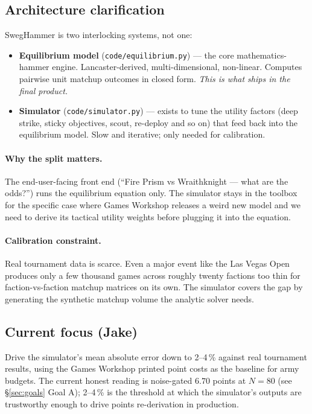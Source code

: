\documentclass[11pt,a4paper]{article}
\begin{document}
\subsection*{Architecture clarification}

SwegHammer is two interlocking systems, not one:

\begin{itemize}[itemsep=2pt]
  \item \textbf{Equilibrium model} (\texttt{code/equilibrium.py}) ---
    the core mathematics-hammer engine. Lancaster-derived,
    multi-dimensional, non-linear. Computes pairwise unit matchup
    outcomes in closed form. \emph{This is what ships in the final
    product.}
  \item \textbf{Simulator} (\texttt{code/simulator.py}) --- exists to
    tune the utility factors (deep strike, sticky objectives, scout,
    re-deploy and so on) that feed back into the equilibrium model.
    Slow and iterative; only needed for calibration.
\end{itemize}

\paragraph{Why the split matters.} The end-user-facing front end
(``Fire Prism vs Wraithknight --- what are the odds?'') runs the
equilibrium equation only. The simulator stays in the toolbox for the
specific case where Games Workshop releases a weird new model and we
need to derive its tactical utility weights before plugging it into
the equation.

\paragraph{Calibration constraint.} Real tournament data is scarce.
Even a major event like the Las Vegas Open produces only a few
thousand games across roughly twenty factions \textemdash{} too thin
for faction-vs-faction matchup matrices on its own. The simulator
covers the gap by generating the synthetic matchup volume the
analytic solver needs.

\subsection*{Current focus (Jake)}

Drive the simulator's mean absolute error down to 2--4\,\% against
real tournament results, using the Games Workshop printed point costs
as the baseline for army budgets. The current honest reading is
noise-gated $6.70$ points at $N{=}80$ (see \S\ref{sec:goals} Goal A); 2--4\,\%
is the threshold at which the simulator's outputs are trustworthy
enough to drive points re-derivation in production.
\end{document}
